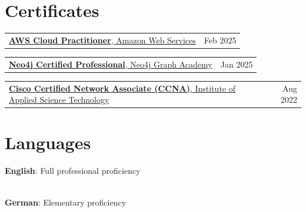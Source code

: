 \documentclass[letterpaper,11pt]{article}
\makeatletter
\newcommand{\resumeItemSimple}[1]{
  \item\small{
    {#1}
  }
}
\newcommand{\resumeItemListStart}{\begin{itemize}[leftmargin=0.5cm, itemsep=1pt, parsep=0pt]} %
\newcommand{\resumeItemListEnd}{\end{itemize}}
\newcommand{\titleWithDescription}[2]{\textbf{#1}{: #2}}
\newcommand{\languageItem}[2]{
    \titleWithDescription{#1}{#2}
}
\newcommand{\certificateItem}[4]{
  \begin{tabular*}{1\textwidth}{l@{\extracolsep{\fill}}r}
    \href{#3}{\textbf{#1}{, #2}} & \small #4 \\
  \end{tabular*}\vspace{-10px}
}
\makeatother
\begin{document}
\section{Certificates}
  \certificateItem
    {AWS Cloud Practitioner}
    {Amazon Web Services}
    {https://www.credly.com/badges/ed1e4a0f-daa1-448d-a060-acb8de1d2ee6}
    {Feb 2025}

    \certificateItem
    {Neo4j Certified Professional}
    {Neo4j Graph Academy}
    {https://graphacademy.neo4j.com/c/d8f0842b-9363-4d27-a25c-68b9cde0aa64/}
    {Jan 2025}

    \certificateItem
    {Cisco Certified Network Associate (CCNA)}
    {Institute of Applied Science Technology}
    {}
    {Aug 2022}


\section{Languages}
  \languageItem
    {English}
    {Full professional proficiency}
  {\vspace{3px}}
  \\
  \languageItem
    {German}
    {Elementary proficiency}
  \hfill
  {\vspace{3px}}

\end{document}

